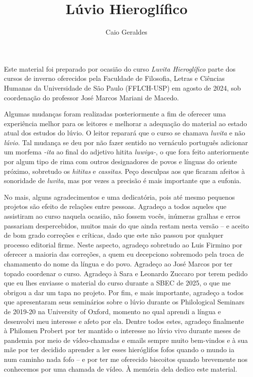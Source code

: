 \documentclass[apostila]{luvio}
\title{Lúvio Hieroglífico}
\author{Caio Geraldes}
\begin{document}
\frontmatter

\thetitlepage%


\cleardoublepage%


\cleardoublepage%
\tableofcontents*

\cleardoublepage%
\listoffigures*


Este material foi preparado por ocasião do curso \emph{Luvita Hieroglífico}
parte dos cursos de inverno oferecidos pela Faculdade de Filosofia, Letras e
Ciências Humanas da Universidade de São Paulo (FFLCH-USP) em agosto de 2024, sob
coordenação do professor José Marcos Mariani de Macedo.

Algumas mudanças foram realizadas posteriormente a fim de oferecer uma
experiência melhor para os leitores e melhorar a adequação do material ao estado
atual dos estudos do lúvio.
O leitor reparará que o curso se chamava \emph{luvita} e não \emph{lúvio}.
Tal mudança se deu por não fazer sentido no vernáculo português adicionar um
morfema \emph{-ita} ao final do adjetivo hitita \emph{luwiya-}, o que fora feito
anteriormente por algum tipo de rima com outros designadores de povos e línguas
do oriente próximo, sobretudo os \emph{hititas} e \emph{cassitas}.
Peço desculpas aos que ficaram afeitos à sonoridade de \emph{luvita}, mas por
vezes a precisão é mais importante que a eufonia.

No mais, alguns agradecimentos e uma dedicatória, pois até mesmo pequenos
projetos são efeito de relações entre pessoas.
Agradeço a todos aqueles que assistiram ao curso naquela ocasião, não
fossem vocês, inúmeras gralhas e erros passariam despercebidos, muitos mais do
que ainda restam nesta versão -- e aceito de bom grado correções e críticas,
dado que este não passou por qualquer processo editorial firme.
Neste aspecto, agradeço sobretudo ao Luis Firmino por oferecer a maioria das
correções, a quem eu decepciono sobremodo pela troca de chamamento do nome da
língua e do povo.
Agradeço ao José Marcos por ter topado coordenar o curso.
Agradeço à Sara e Leonardo Zuccaro por terem pedido que eu lhes enviasse o
material do curso durante a SBEC de 2025, o que me obrigou a dar um tapa no
projeto.
Por fim, e mais importante, agradeço a todos que apresentaram seus seminários
sobre o lúvio durante os Philological Seminars de 2019-20 na University of
Oxford, momento no qual aprendi a língua e desenvolvi meu interesse e afeto por
ela.
Dentre todos estes, agradeço finalmente à Philomen Probert por ter mantido o
interesse no lúvio vivo durante meses de pandemia por meio de vídeo-chamadas e
emails sempre muito bem-vindos e à sua mãe por ter decidido aprender a ler esses
hieróglifos fofos quando o mundo ia num caminho nada fofo -- e por ter me oferecido
biscoitos quando brevemente nos conhecemos por uma chamada de vídeo.
À memória dela dedico este material.
\end{document}
